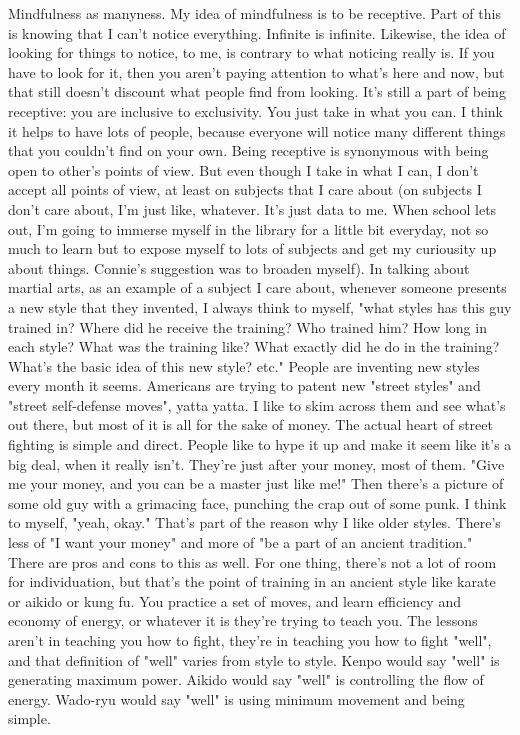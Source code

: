 Mindfulness as manyness. My idea of mindfulness is to be receptive. Part of this is knowing that I can't notice everything. Infinite is infinite.
Likewise, the idea of looking for things to notice, to me, is contrary to what noticing really is. If you have to look for it, then you aren't paying attention to what's here and now, but that still doesn't discount what people find from looking. It's still a part of being receptive: you are inclusive to exclusivity.
You just take in what you can.
I think it helps to have lots of people, because everyone will notice many different things that you couldn't find on your own. Being receptive is synonymous with being open to other's points of view.
But even though I take in what I can, I don't accept all points of view, at least on subjects that I care about (on subjects I don't care about, I'm just like, whatever. It's just data to me. When school lets out, I'm going to immerse myself in the library for a little bit everyday, not so much to learn but to expose myself to lots of subjects and get my curiousity up about things. Connie's suggestion was to broaden myself).
In talking about martial arts, as an example of a subject I care about, whenever someone presents a new style that they invented, I always think to myself, "what styles has this guy trained in? Where did he receive the training? Who trained him? How long in each style? What was the training like? What exactly did he do in the training? What's the basic idea of this new style? etc."
People are inventing new styles every month it seems. Americans are trying to patent new "street styles" and "street self-defense moves", yatta yatta. I like to skim across them and see what's out there, but most of it is all for the sake of money. The actual heart of street fighting is simple and direct. People like to hype it up and make it seem like it's a big deal, when it really isn't. They're just after your money, most of them. "Give me your money, and you can be a master just like me!" Then there's a picture of some old guy with a grimacing face, punching the crap out of some punk. I think to myself, "yeah, okay."
That's part of the reason why I like older styles. There's less of "I want your money" and more of "be a part of an ancient tradition." There are pros and cons to this as well. For one thing, there's not a lot of room for individuation, but that's the point of training in an ancient style like karate or aikido or kung fu. You practice a set of moves, and learn efficiency and economy of energy, or whatever it is they're trying to teach you. The lessons aren't in teaching you how to fight, they're in teaching you how to fight "well", and that definition of "well" varies from style to style. Kenpo would say "well" is generating maximum power. Aikido would say "well" is controlling the flow of energy. Wado-ryu would say "well" is using minimum movement and being simple.
